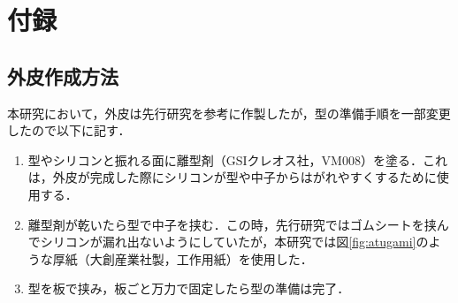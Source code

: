 \newpage
\appendix
\setcounter{figure}{0} %
\section{付録}
\subsection{外皮作成方法}
本研究において，外皮は先行研究\cite{kyu}を参考に作製したが，型の準備手順を一部変更したので以下に記す．
\begin{enumerate}
    \item 型やシリコンと振れる面に離型剤（GSIクレオス社，VM008）を塗る．これは，外皮が完成した際にシリコンが型や中子からはがれやすくするために使用する．
    \item 離型剤が乾いたら型で中子を挟む．この時，先行研究\cite{kyu}ではゴムシートを挟んでシリコンが漏れ出ないようにしていたが，本研究では図\ref{fig:atugami}のような厚紙（大創産業社製，工作用紙）を使用した．
    \item 型を板で挟み，板ごと万力で固定したら型の準備は完了．
\end{enumerate}

